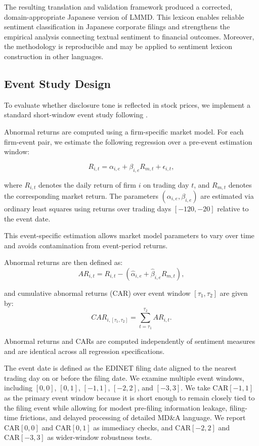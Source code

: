 The resulting translation and validation framework produced a corrected, domain-appropriate Japanese version of LMMD. 
This lexicon enables reliable sentiment classification in Japanese corporate filings and strengthens the empirical analysis connecting textual sentiment to financial outcomes. 
Moreover, the methodology is reproducible and may be applied to sentiment lexicon construction in other languages.

\subsection{Event Study Design}
\label{subsec:eventstudy}

To evaluate whether disclosure tone is reflected in stock prices, we implement a standard short-window event study following \citet{mackinlay1997event}.

Abnormal returns are computed using a firm-specific market model. For each firm-event pair, we estimate the following regression over a pre-event estimation window:

\begin{equation}
R_{i,t} = \alpha_{i,e} + \beta_{i,e} R_{m,t} + \epsilon_{i,t},
\end{equation}

where $R_{i,t}$ denotes the daily return of firm $i$ on trading day $t$, and $R_{m,t}$ denotes the corresponding market return. The parameters $(\alpha_{i,e}, \beta_{i,e})$ are estimated via ordinary least squares using returns over trading days $[-120, -20]$ relative to the event date.

This event-specific estimation allows market model parameters to vary over time and avoids contamination from event-period returns.

Abnormal returns are then defined as:
\begin{equation}
AR_{i,t} = R_{i,t} - (\hat{\alpha}_{i,e} + \hat{\beta}_{i,e} R_{m,t}),
\end{equation}

and cumulative abnormal returns (CAR) over event window $[\tau_1, \tau_2]$ are given by:
\begin{equation}
CAR_{i,[\tau_1,\tau_2]} = \sum_{t=\tau_1}^{\tau_2} AR_{i,t}.
\end{equation}

Abnormal returns and CARs are computed independently of sentiment measures and are identical across all regression specifications.

The event date is defined as the EDINET filing date aligned to the nearest trading day on or before the filing date. We examine multiple event windows, including $[0,0]$, $[0,1]$, $[-1,1]$, $[-2,2]$, and $[-3,3]$. We take $\mathrm{CAR}[-1,1]$ as the primary event window because it is short enough to remain closely tied to the filing event while allowing for modest pre-filing information leakage, filing-time frictions, and delayed processing of detailed MD\&A language. We report $\mathrm{CAR}[0,0]$ and $\mathrm{CAR}[0,1]$ as immediacy checks, and $\mathrm{CAR}[-2,2]$ and $\mathrm{CAR}[-3,3]$ as wider-window robustness tests.

